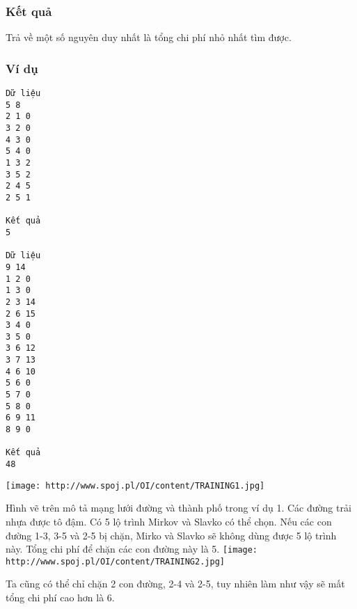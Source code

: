 \subsubsection{   Kết quả  }

   Trả về một số nguyên duy nhất là tổng chi phí nhỏ nhất tìm được.  

\subsubsection{   Ví dụ  }
\begin{verbatim}
Dữ liệu
5 8
2 1 0
3 2 0
4 3 0
5 4 0
1 3 2
3 5 2
2 4 5
2 5 1

Kết quả
5

Dữ liệu
9 14
1 2 0
1 3 0
2 3 14
2 6 15
3 4 0
3 5 0
3 6 12
3 7 13
4 6 10
5 6 0
5 7 0
5 8 0
6 9 11
8 9 0

Kết quả
48
\end{verbatim}
\texttt{[image: http://www.spoj.pl/OI/content/TRAINING1.jpg]}

   Hình vẽ trên mô tả mạng lưới đường và thành phố trong ví dụ 1. Các đường trải nhựa được tô đậm. Có 5 lộ trình Mirkov và Slavko có thể chọn. Nếu các con đường 1-3, 3-5 và 2-5 bị chặn, Mirko và Slavko sẽ không dùng được 5 lộ trình này. Tổng chi phí để chặn các con đường này là 5.  
\texttt{[image: http://www.spoj.pl/OI/content/TRAINING2.jpg]}

   Ta cũng có thể chỉ chặn 2 con đường, 2-4 và 2-5, tuy nhiên làm như vậy sẽ mất tổng chi phí cao hơn là 6.  